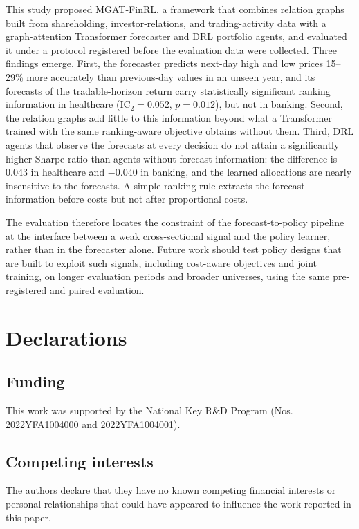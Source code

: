 \documentclass[pdflatex,sn-mathphys-num]{sn-jnl}%
\theoremstyle{thmstyleone}%
\theoremstyle{thmstyletwo}%
\theoremstyle{thmstylethree}%
\begin{document}
{\color{blue}This study proposed MGAT-FinRL, a framework that combines relation graphs built from shareholding, investor-relations, and trading-activity data with a graph-attention Transformer forecaster and DRL portfolio agents, and evaluated it under a protocol registered before the evaluation data were collected. Three findings emerge. First, the forecaster predicts next-day high and low prices 15--29\% more accurately than previous-day values in an unseen year, and its forecasts of the tradable-horizon return carry statistically significant ranking information in healthcare (IC$_2=0.052$, $p=0.012$), but not in banking. Second, the relation graphs add little to this information beyond what a Transformer trained with the same ranking-aware objective obtains without them. Third, DRL agents that observe the forecasts at every decision do not attain a significantly higher Sharpe ratio than agents without forecast information: the difference is 0.043 in healthcare and $-0.040$ in banking, and the learned allocations are nearly insensitive to the forecasts. A simple ranking rule extracts the forecast information before costs but not after proportional costs.

The evaluation therefore locates the constraint of the forecast-to-policy pipeline at the interface between a weak cross-sectional signal and the policy learner, rather than in the forecaster alone. Future work should test policy designs that are built to exploit such signals, including cost-aware objectives and joint training, on longer evaluation periods and broader universes, using the same pre-registered and paired evaluation.\par}

\section*{Declarations}
\subsection*{Funding}
This work was supported by the National Key R\&D Program (Nos. 2022YFA1004000 and 2022YFA1004001).

\subsection*{Competing interests}
The authors declare that they have no known competing financial interests or personal relationships that could have appeared to influence the work reported in this paper.
\end{document}
